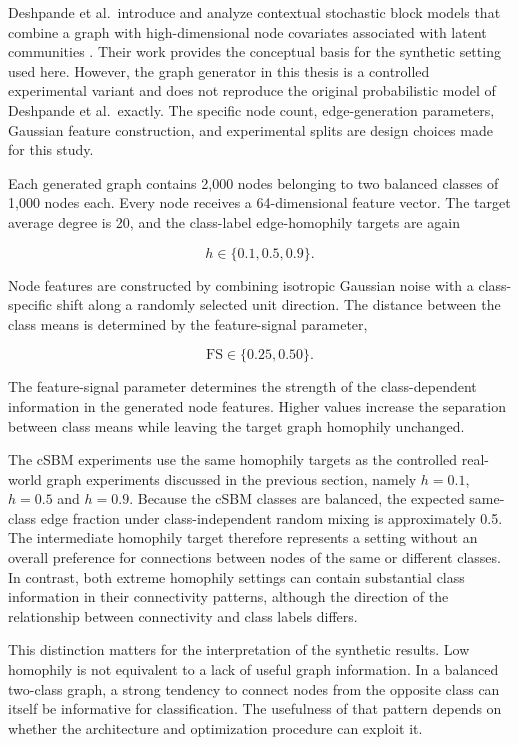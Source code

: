 \documentclass[english]{lni}
\begin{document}
Deshpande et al.\ introduce and analyze contextual stochastic block models that combine a graph with high-dimensional node covariates associated with latent communities \cite{deshpande2018csbm}. Their work provides the conceptual basis for the synthetic setting used here. However, the graph generator in this thesis is a controlled experimental variant and does not reproduce the original probabilistic model of Deshpande et al.\ exactly. The specific node count, edge-generation parameters, Gaussian feature construction, and experimental splits are design choices made for this study.

Each generated graph contains 2,000 nodes belonging to two balanced classes of 1,000 nodes each. Every node receives a 64-dimensional feature vector. The target average degree is 20, and the class-label edge-homophily targets are again 

\[
h\in\{0.1,0.5,0.9\}.
\]

Node features are constructed by combining isotropic Gaussian noise with a class-specific shift along a randomly selected unit direction. The distance between the class means is determined by the feature-signal parameter,

\[
\mathrm{FS}\in\{0.25,0.50\}.
\]

The feature-signal parameter determines the strength of the class-dependent information in the generated node features. Higher values increase the separation between class means while leaving the target graph homophily unchanged.

The cSBM experiments use the same homophily targets as the controlled real-world graph experiments discussed in the previous section, namely $h=0.1$, $h=0.5$ and $h=0.9$. Because the cSBM classes are balanced, the expected same-class edge fraction under class-independent random mixing is approximately 0.5. The intermediate homophily target therefore represents a setting without an overall preference for connections between nodes of the same or different classes. In contrast, both extreme homophily settings can contain substantial class information in their connectivity patterns, although the direction of the relationship between connectivity and class labels differs.

This distinction matters for the interpretation of the synthetic results. Low homophily is not equivalent to a lack of useful graph information. In a balanced two-class graph, a strong tendency to connect nodes from the opposite class can itself be informative for classification. The usefulness of that pattern depends on whether the architecture and optimization procedure can exploit it.
\end{document}
